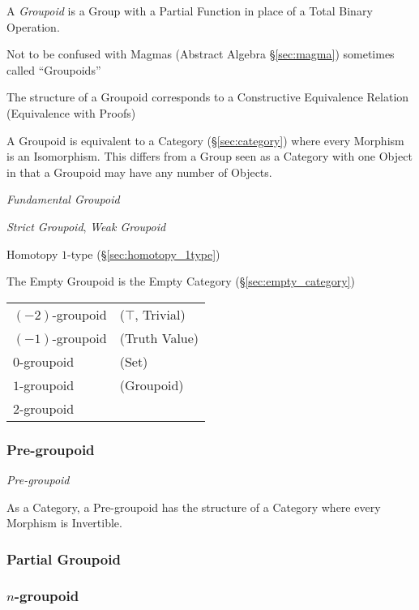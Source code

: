 A \emph{Groupoid} is a Group with a Partial Function in place of a
Total Binary Operation.

\fist Not to be confused with Magmas (Abstract Algebra \S\ref{sec:magma})
sometimes called ``Groupoids''

The structure of a Groupoid corresponds to a Constructive Equivalence
Relation (Equivalence with Proofs)

A Groupoid is equivalent to a Category (\S\ref{sec:category}) where
every Morphism is an Isomorphism. This differs from a Group seen as a
Category with one Object in that a Groupoid may have any number of
Objects.

\emph{Fundamental Groupoid}

\emph{Strict Groupoid}, \emph{Weak Groupoid}

Homotopy $1$-type (\S\ref{sec:homotopy_1type})

The Empty Groupoid is the Empty Category (\S\ref{sec:empty_category})

\begin{tabular}{l l}
  $(-2)$-groupoid & ($\top$, Trivial) \\

  $(-1)$-groupoid & (Truth Value) \\

  $0$-groupoid    & (Set) \\

  $1$-groupoid    & (Groupoid) \\

  $2$-groupoid    & \\
\end{tabular}



\subsubsection{Pre-groupoid}\label{sec:pre_groupoid}

\emph{Pre-groupoid}

As a Category, a Pre-groupoid has the structure of a Category where
every Morphism is Invertible.



\subsubsection{Partial Groupoid}\label{sec:partial_groupoid}

\subsubsection{$n$-groupoid}\label{sec:n_groupoid}

